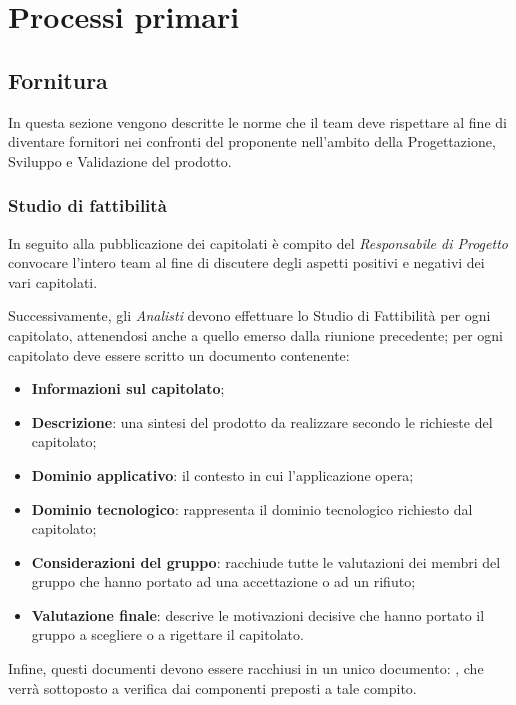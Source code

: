 \section{Processi primari}
\subsection{Fornitura}
In questa sezione vengono descritte le norme che il team deve rispettare al fine di diventare fornitori nei confronti del proponente nell'ambito della Progettazione, Sviluppo e Validazione del prodotto.
\subsubsection{Studio di fattibilità}
In seguito alla pubblicazione dei capitolati è compito del \textit{Responsabile di Progetto} convocare l'intero team al fine di discutere degli aspetti positivi e negativi dei vari capitolati.

Successivamente, gli \textit{Analisti} devono effettuare lo Studio di Fattibilità per ogni capitolato, attenendosi anche a quello emerso dalla riunione precedente; per ogni capitolato deve essere scritto un documento contenente:
\begin{itemize}
\item \textbf{Informazioni sul capitolato};
\item \textbf{Descrizione}: una sintesi del prodotto da realizzare secondo le richieste del capitolato;
\item \textbf{Dominio applicativo}: il contesto in cui l'applicazione opera;
\item \textbf{Dominio tecnologico}: rappresenta il dominio tecnologico richiesto dal capitolato;
\item \textbf{Considerazioni del gruppo}: racchiude tutte le valutazioni dei membri del gruppo che hanno portato ad una accettazione o ad un rifiuto;
\item \textbf{Valutazione finale}: descrive le motivazioni decisive che hanno portato il gruppo a scegliere o a rigettare il capitolato.
\end{itemize}


Infine, questi documenti devono essere racchiusi in un unico documento: \SdF , che verrà sottoposto a verifica dai componenti preposti a tale compito.

